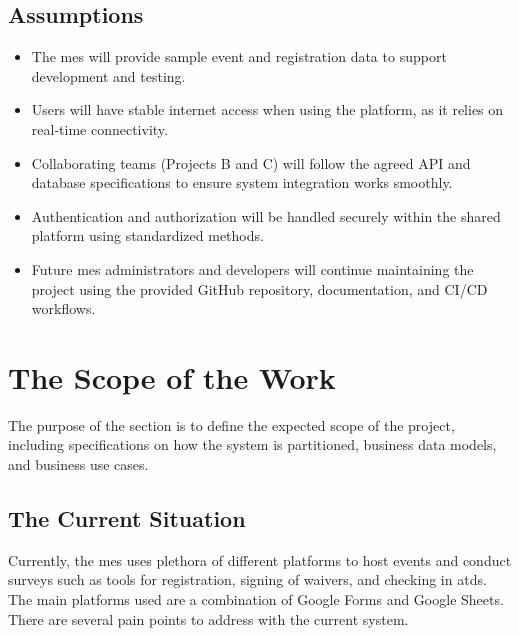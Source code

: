 \documentclass[12pt]{article}
\begin{document}
\subsection{Assumptions}

\begin{itemize}
    \item The \gls{mes} will provide sample event and registration data to support development and testing.
    \item Users will have stable internet access when using the platform, as it relies on real-time connectivity.
    \item Collaborating teams (Projects B and C) will follow the agreed API and database specifications to ensure system
      integration works smoothly.
    \item Authentication and authorization will be handled securely within the shared platform using standardized
      methods.
    \item Future \gls{mes} administrators and developers will continue maintaining the project using the provided GitHub
      repository, documentation, and CI/CD workflows.
\end{itemize}

\section{The Scope of the Work}

The purpose of the section is to define the expected scope of the project, including specifications on how the system is
partitioned, business data models, and business use cases.

\subsection{The Current Situation}

Currently, the \gls{mes} uses plethora of different platforms to host events and conduct surveys such as tools for
registration, signing of waivers, and checking in \glspl{atd}. The main platforms used are a combination of Google Forms
and Google Sheets. There are several pain points to address with the current system.
\end{document}
